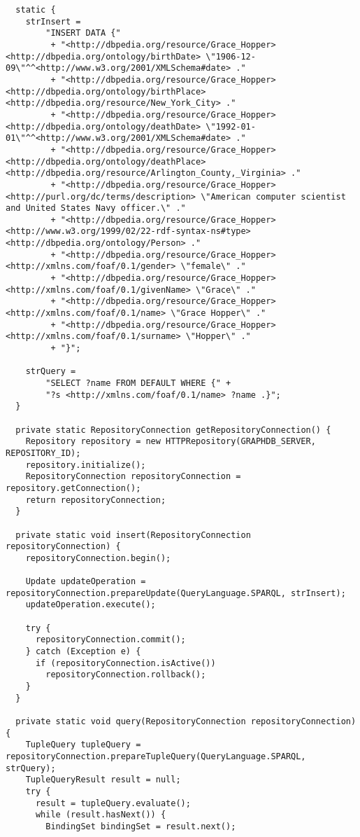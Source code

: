 \documentclass{amsart}
\begin{document}
\begin{small}
\begin{verbatim}
  static {
    strInsert = 
        "INSERT DATA {"
         + "<http://dbpedia.org/resource/Grace_Hopper> <http://dbpedia.org/ontology/birthDate> \"1906-12-09\"^^<http://www.w3.org/2001/XMLSchema#date> ."
         + "<http://dbpedia.org/resource/Grace_Hopper> <http://dbpedia.org/ontology/birthPlace> <http://dbpedia.org/resource/New_York_City> ."
         + "<http://dbpedia.org/resource/Grace_Hopper> <http://dbpedia.org/ontology/deathDate> \"1992-01-01\"^^<http://www.w3.org/2001/XMLSchema#date> ."
         + "<http://dbpedia.org/resource/Grace_Hopper> <http://dbpedia.org/ontology/deathPlace> <http://dbpedia.org/resource/Arlington_County,_Virginia> ."
         + "<http://dbpedia.org/resource/Grace_Hopper> <http://purl.org/dc/terms/description> \"American computer scientist and United States Navy officer.\" ."
         + "<http://dbpedia.org/resource/Grace_Hopper> <http://www.w3.org/1999/02/22-rdf-syntax-ns#type> <http://dbpedia.org/ontology/Person> ."
         + "<http://dbpedia.org/resource/Grace_Hopper> <http://xmlns.com/foaf/0.1/gender> \"female\" ."
         + "<http://dbpedia.org/resource/Grace_Hopper> <http://xmlns.com/foaf/0.1/givenName> \"Grace\" ."
         + "<http://dbpedia.org/resource/Grace_Hopper> <http://xmlns.com/foaf/0.1/name> \"Grace Hopper\" ."
         + "<http://dbpedia.org/resource/Grace_Hopper> <http://xmlns.com/foaf/0.1/surname> \"Hopper\" ."        
         + "}";
    
    strQuery = 
        "SELECT ?name FROM DEFAULT WHERE {" +
        "?s <http://xmlns.com/foaf/0.1/name> ?name .}";
  }  
  
  private static RepositoryConnection getRepositoryConnection() {
    Repository repository = new HTTPRepository(GRAPHDB_SERVER, REPOSITORY_ID);
    repository.initialize();
    RepositoryConnection repositoryConnection = repository.getConnection();
    return repositoryConnection;
  }
  
  private static void insert(RepositoryConnection repositoryConnection) {
    repositoryConnection.begin();
    
    Update updateOperation = repositoryConnection.prepareUpdate(QueryLanguage.SPARQL, strInsert);
    updateOperation.execute();
    
    try {
      repositoryConnection.commit();
    } catch (Exception e) {
      if (repositoryConnection.isActive())
        repositoryConnection.rollback();
    }
  }

  private static void query(RepositoryConnection repositoryConnection) {
    TupleQuery tupleQuery = repositoryConnection.prepareTupleQuery(QueryLanguage.SPARQL, strQuery);
    TupleQueryResult result = null;
    try {
      result = tupleQuery.evaluate();
      while (result.hasNext()) {
        BindingSet bindingSet = result.next();


\end{verbatim}
\end{small}
\end{document}
